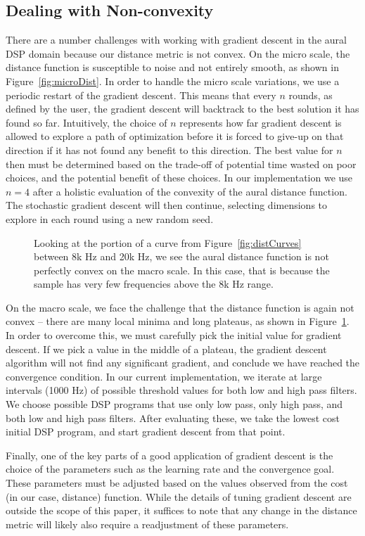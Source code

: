 \subsection{Dealing with Non-convexity}
There are a number challenges with working with gradient descent in the aural DSP domain because our distance metric is not convex.
On the micro scale, the distance function is susceptible to noise and not entirely smooth, as shown in Figure~\ref{fig:microDist}.
In order to handle the micro scale variations, we use a periodic restart of the gradient descent.
This means that every $n$ rounds, as defined by the user, the gradient descent will backtrack to the best solution it has found so far.
Intuitively, the choice of $n$ represents how far gradient descent is allowed to explore a path of optimization before it is forced to give-up on that direction if it has not found any benefit to this direction.
The best value for $n$ then must be determined based on the trade-off of potential time wasted on poor choices, and the potential benefit of these choices.
In our implementation we use $n=4$ after a holistic evaluation of the convexity of the aural distance function.
The stochastic gradient descent will then continue, selecting dimensions to explore in each round using a new random seed.

\begin{figure}

\caption{Looking at the portion of a curve from Figure~\ref{fig:distCurves} between 8k Hz and 20k Hz, we see the aural distance function is not perfectly convex on the macro scale. In this case, that is because the sample has very few frequencies above the 8k Hz range.}
\label{fig:macroDist}
\end{figure}

On the macro scale, we face the challenge that the distance function is again not convex -- there are many local minima and long plateaus, as shown in Figure~\ref{fig:macroDist}.
In order to overcome this, we must carefully pick the initial value for gradient descent.
If we pick a value in the middle of a plateau, the gradient descent algorithm will not find any significant gradient, and conclude we have reached the convergence condition.
In our current implementation, we iterate at large intervals (1000 Hz) of possible threshold values for both low and high pass filters.
We choose possible DSP programs that use only low pass, only high pass, and both low and high pass filters.
After evaluating these, we take the lowest cost initial DSP program, and start gradient descent from that point.

Finally, one of the key parts of a good application of gradient descent is the choice of the parameters such as the learning rate and the convergence goal.
These parameters must be adjusted based on the values observed from the cost (in our case, distance) function.
While the details of tuning gradient descent are outside the scope of this paper, it suffices to note that any change in the distance metric will likely also require a readjustment of these parameters.

